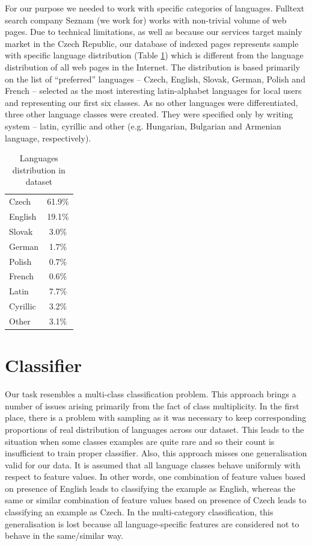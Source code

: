 \documentclass{acm_proc_article-sp}
\begin{document}
  For our purpose we needed to work with specific categories of languages.
  Fulltext search company Seznam (we work for) works with non-trivial volume of web pages.
  Due to technical limitations, as well as because our services target mainly market in the Czech Republic,
  our database of indexed pages represents sample with specific language distribution (Table \ref{langdist}) which is different from the
  language distribution of all web pages in the Internet.
  The distribution is based primarily on the list of ``preferred'' languages –
  Czech, English, Slovak, German, Polish and French –
  selected as the most interesting latin-alphabet languages for local users and representing  our first six classes.
  As no other languages were differentiated, three other language classes were created. They were specified only by writing system
  – latin, cyrillic and other (e.g. Hungarian, Bulgarian and Armenian language, respectively).

  \begin{table}[]
 \centering
 \caption{Languages distribution in dataset} 
 \label{langdist} 
 \vspace{0.2cm}
 \begin{tabular}{l||c}
    Czech & 61.9\% \\
    English & 19.1\% \\
    Slovak & 3.0\% \\
    German & 1.7\% \\
    Polish & 0.7\% \\
    French & 0.6\% \\ \hline
    Latin & 7.7\% \\
    Cyrillic & 3.2\% \\
    Other & 3.1\% \\
 \end{tabular}
 \end{table}


 \section{Classifier}
 \label{sec:classifier}

  Our task resembles a multi-class classification problem. 
  This approach brings a number of issues arising primarily from the fact of class multiplicity. 
  In the first place, there is a problem with sampling as it was necessary to keep corresponding proportions 
  of real distribution of languages across our dataset. 
  This leads to the situation when some classes examples are quite rare and so their count is insufficient 
  to train proper classifier. Also, this approach misses one generalisation valid for our data.
  It is assumed that all language classes behave uniformly with respect to feature values. In other words, 
  one combination of feature values based on presence of English leads to classifying the example as English, whereas 
  the same or similar combination of feature values based on presence of Czech leads to classifying an example as Czech.
  In the multi-category classification, this generalisation is lost because all language-specific features are considered
  not to behave in the same/similar way.
\end{document}
